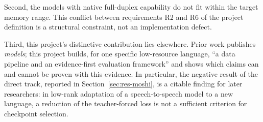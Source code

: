 Second, the models with native full-duplex capability do not fit within the target
memory range. This conflict between requirements R2 and R6 of the project definition
is a structural constraint, not an implementation defect.

Third, this project's distinctive contribution lies elsewhere. Prior work publishes
\emph{models}; this project builds, for one specific low-resource language, ``a data
pipeline and an evidence-first evaluation framework'' and shows which claims can and
cannot be proven with this evidence. In particular, the negative result of the direct
track, reported in Section~\ref{sec:res-moshi}, is a citable finding for later
researchers: in low-rank adaptation of a speech-to-speech model to a new language, a
reduction of the teacher-forced loss is not a sufficient criterion for checkpoint
selection.
